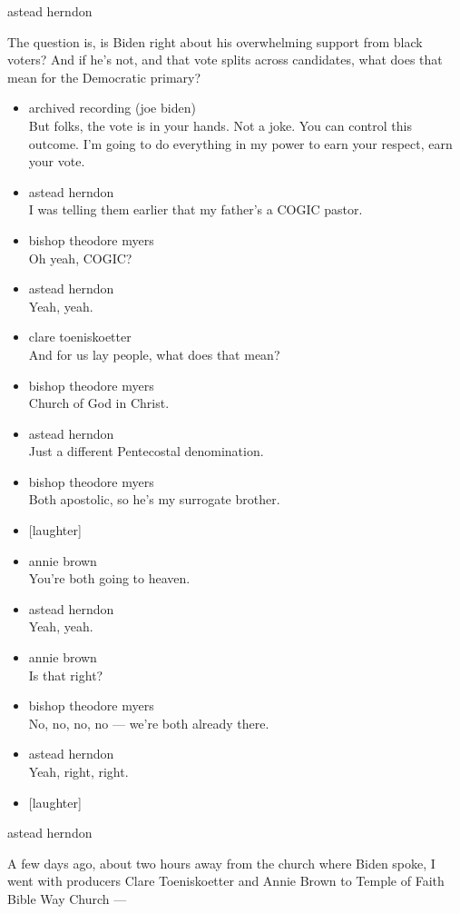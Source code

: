 astead herndon

The question is, is Biden right about his overwhelming support from
black voters? And if he's not, and that vote splits across candidates,
what does that mean for the Democratic primary?

\begin{itemize}
\item
  archived recording (joe biden)\\
  But folks, the vote is in your hands. Not a joke. You can control this
  outcome. I'm going to do everything in my power to earn your respect,
  earn your vote.
\item
  astead herndon\\
  I was telling them earlier that my father's a COGIC pastor.
\item
  bishop theodore myers\\
  Oh yeah, COGIC?
\item
  astead herndon\\
  Yeah, yeah.
\item
  clare toeniskoetter\\
  And for us lay people, what does that mean?
\item
  bishop theodore myers\\
  Church of God in Christ.
\item
  astead herndon\\
  Just a different Pentecostal denomination.
\item
  bishop theodore myers\\
  Both apostolic, so he's my surrogate brother.
\item
  {[}laughter{]}
\item
  annie brown\\
  You're both going to heaven.
\item
  astead herndon\\
  Yeah, yeah.
\item
  annie brown\\
  Is that right?
\item
  bishop theodore myers\\
  No, no, no, no --- we're both already there.
\item
  astead herndon\\
  Yeah, right, right.
\item
  {[}laughter{]}
\end{itemize}

astead herndon

A few days ago, about two hours away from the church where Biden spoke,
I went with producers Clare Toeniskoetter and Annie Brown to Temple of
Faith Bible Way Church ---

